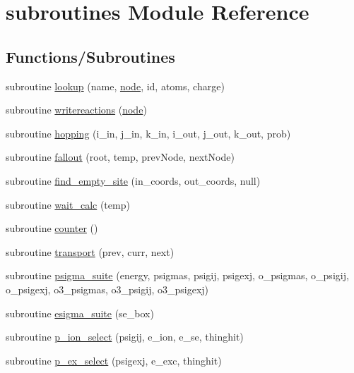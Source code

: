 \hypertarget{namespacesubroutines}{
\section{subroutines Module Reference}
\label{namespacesubroutines}
}
\subsection*{Functions/Subroutines}
\begin{DoxyCompactItemize}
\item 
subroutine \hyperlink{namespacesubroutines_a27505ee5071c93bb5f1e570995a1ac42}{lookup} (name, \hyperlink{typetypedefs_1_1node}{node}, id, atoms, charge)
\item 
subroutine \hyperlink{namespacesubroutines_a0ce9ee9331d3c0bba11e3e00fbd7e07b}{writereactions} (\hyperlink{typetypedefs_1_1node}{node})
\item 
subroutine \hyperlink{namespacesubroutines_ad97e0b9db9cfe6329f9f8fdb886077e7}{hopping} (i\_\-in, j\_\-in, k\_\-in, i\_\-out, j\_\-out, k\_\-out, prob)
\item 
subroutine \hyperlink{namespacesubroutines_a7a31d5c9fbda24651c932b0466618567}{fallout} (root, temp, prevNode, nextNode)
\item 
subroutine \hyperlink{namespacesubroutines_af4c69699bd3e0e4aa05607a7e94044dc}{find\_\-empty\_\-site} (in\_\-coords, out\_\-coords, null)
\item 
subroutine \hyperlink{namespacesubroutines_ac847bd99eab89bdc881d885b2808624d}{wait\_\-calc} (temp)
\item 
subroutine \hyperlink{namespacesubroutines_af250b65cb2805243dd52e4e3535f4c5a}{counter} ()
\item 
subroutine \hyperlink{namespacesubroutines_a0a51843cbd2415487f29e4314e1de97a}{transport} (prev, curr, next)
\item 
subroutine \hyperlink{namespacesubroutines_a37b9d3b519b164f5ef3835bf4e1e4f8c}{psigma\_\-suite} (energy, psigmas, psigij, psigexj, o\_\-psigmas, o\_\-psigij, o\_\-psigexj, o3\_\-psigmas, o3\_\-psigij, o3\_\-psigexj)
\item 
subroutine \hyperlink{namespacesubroutines_a27620c6392f4cd49238c295cbe60e179}{esigma\_\-suite} (se\_\-box)
\item 
subroutine \hyperlink{namespacesubroutines_a3185cd857374fa3b0a19f2a56e6474df}{p\_\-ion\_\-select} (psigij, e\_\-ion, e\_\-se, thinghit)
\item 
subroutine \hyperlink{namespacesubroutines_acad706394e0b01bbd1e5345585dace59}{p\_\-ex\_\-select} (psigexj, e\_\-exc, thinghit)

\end{DoxyCompactItemize}
